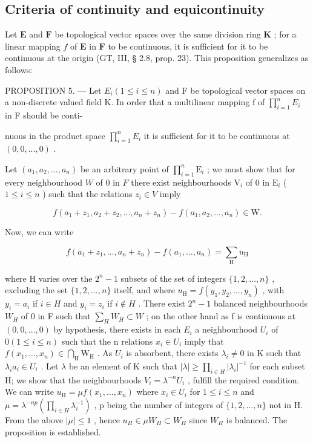 \subsection{Criteria of continuity and equicontinuity}

Let \(\mathbf{E}\) and \(\mathbf{F}\) be topological vector spaces over the same division ring \(\mathbf{K}\) ; for a linear mapping \(f\) of \(\mathbf{E}\) in \(\mathbf{F}\) to be continuous, it is sufficient for it to be continuous at the origin (GT, III, § 2.8, prop. 23). This proposition generalizes as follows:

PROPOSITION 5. --- Let \(E_{i}(1 \leqslant i \leqslant n)\) and F be topological vector spaces on a non-discrete valued field K. In order that a multilinear mapping f of \(\prod_{i=1}^{n} E_{i}\) in F should be conti-

nuous in the product space \(\prod_{i=1}^{n} E_i\) it is sufficient for it to be continuous at \((0, 0, ..., 0)\) .

Let \((a_{1}, a_{2}, \ldots, a_{n})\) be an arbitrary point of \(\prod_{i=1}^{n} \mathrm{E}_{i}\) ; we must show that for every neighbourhood \(W\) of 0 in \(F\) there exist neighbourhoods \(\mathrm{V}_{i}\) of 0 in \(\mathrm{E}_{i}\) ( \(1 \leqslant i \leqslant n\) ) such that the relations \(z_{i} \in V\) imply

\[
f \left(a _ {1} + z _ {1}, a _ {2} + z _ {2}, \dots , a _ {n} + z _ {n}\right) - f \left(a _ {1}, a _ {2}, \dots , a _ {n}\right) \in \mathrm{W}.
\]

Now, we can write

\[
f (a _ {1} + z _ {1}, \dots , a _ {n} + z _ {n}) - f (a _ {1}, \dots , a _ {n}) = \sum_ {\mathrm{H}} u _ {\mathrm{H}}
\]

where H varies over the \(2^{n}-1\) subsets of the set of integers \(\{1,2,\ldots,n\}\) , excluding the set \(\{1,2,\ldots,n\}\) itself, and where \(u_{\mathrm{H}}=f(y_{1},y_{2},\ldots,y_{n})\) , with \(y_{i}=a_{i}\) if \(i\in H\) and \(y_{i}=z_{i}\) if \(i\notin H\) . There exist \(2^{n}-1\) balanced neighbourhoods \(W_{H}\) of 0 in F such that \(\sum_{H}W_{H}\subset W\) ; on the other hand as f is continuous at \((0,0,\ldots,0)\) by hypothesis, there exists in each \(E_{i}\) a neighbourhood \(U_{i}\) of \(0(1\leqslant i\leqslant n)\) such that the n relations \(x_{i}\in U_{i}\) imply that \(f(x_{1},\ldots,x_{n})\in\bigcap_{\mathrm{H}}\mathrm{W}_{\mathrm{H}}\) . As \(U_{i}\) is absorbent, there exists \(\lambda_{i}\neq0\) in K such that \(\lambda_{i}a_{i}\in U_{i}\) . Let \(\lambda\) be an element of K such that \(|\lambda|\geqslant\prod_{i\in H}|\lambda_{i}|^{-1}\) for each subset H; we show that the neighbourhoods \(V_{i}=\lambda^{-n}U_{i}\) , fulfill the required condition. We can write \(u_{\mathrm{H}}=\mu f(x_{1},\ldots,x_{n})\) where \(x_{i}\in U_{i}\) for \(1\leqslant i\leqslant n\) and \(\mu=\lambda^{-np}(\prod_{i\in H}\lambda_{i}^{-1})\) , p being the number of integers of \(\{1,2,\ldots,n\}\) not in H. From the above \(|\mu|\leqslant1\) , hence \(u_{H}\in\mu W_{H}\subset W_{H}\) since \(W_{H}\) is balanced. The proposition is established.

